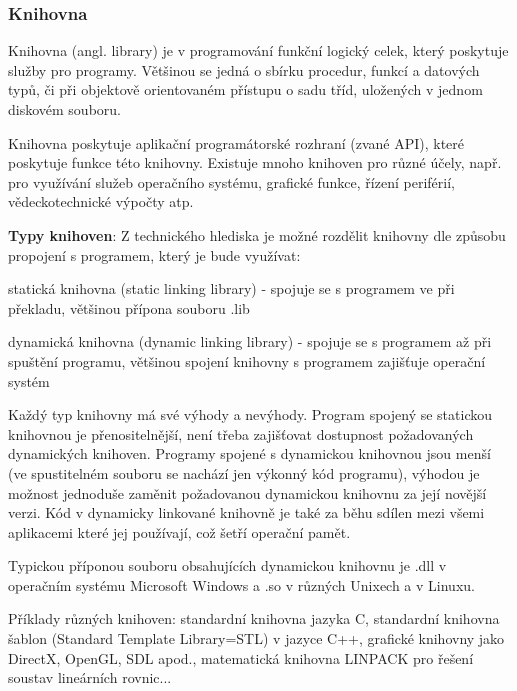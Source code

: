 \subsubsection*{Knihovna}
Knihovna (angl. library) je v programování funkční logický celek, který poskytuje služby pro programy. Většinou se jedná o sbírku procedur, funkcí a datových typů, či při objektově orientovaném přístupu o sadu tříd, uložených v jednom diskovém souboru.

Knihovna poskytuje aplikační programátorské rozhraní (zvané API), které poskytuje funkce této knihovny. Existuje mnoho knihoven pro různé účely, např. pro využívání služeb operačního systému, grafické funkce, řízení periférií, vědeckotechnické výpočty atp.

\textbf{Typy knihoven}: Z technického hlediska je možné rozdělit knihovny dle způsobu propojení s programem, který je bude využívat:
\begin{pitemize}
	\item statická knihovna (static linking library) - spojuje se s programem ve při překladu, většinou přípona souboru .lib
	\item dynamická knihovna (dynamic linking library) - spojuje se s programem až při spuštění programu, většinou spojení knihovny s programem zajišťuje operační systém
\end{pitemize}

Každý typ knihovny má své výhody a nevýhody. Program spojený se statickou knihovnou je přenositelnější, není třeba zajišťovat dostupnost požadovaných dynamických knihoven. Programy spojené s dynamickou knihovnou jsou menší (ve spustitelném souboru se nachází jen výkonný kód programu), výhodou je možnost jednoduše zaměnit požadovanou dynamickou knihovnu za její novější verzi. Kód v dynamicky linkované knihovně je také za běhu sdílen mezi všemi aplikacemi které jej používají, což šetří operační pamět.

Typickou příponou souboru obsahujících dynamickou knihovnu je .dll v operačním systému Microsoft Windows a .so v různých Unixech a v Linuxu.

Příklady různých knihoven: standardní knihovna jazyka C, standardní knihovna šablon (Standard Template Library=STL) v jazyce C++, grafické knihovny jako DirectX, OpenGL, SDL apod., matematická knihovna LINPACK pro řešení soustav lineárních rovnic...
